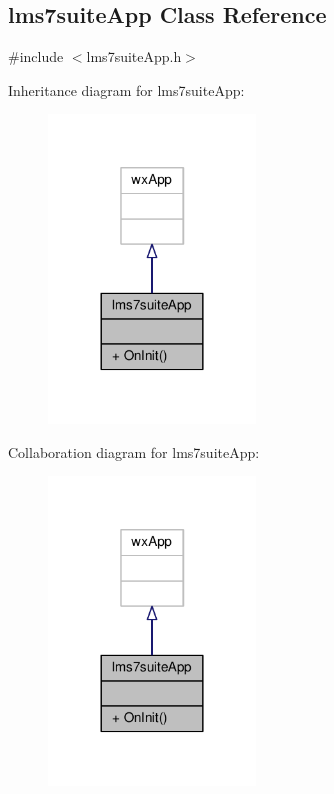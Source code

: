 \subsection{lms7suite\+App Class Reference}
\label{classlms7suiteApp}


{\ttfamily \#include $<$lms7suite\+App.\+h$>$}



Inheritance diagram for lms7suite\+App\+:
\nopagebreak
\begin{figure}[H]
\begin{center}
\leavevmode
\includegraphics[width=156pt]{d0/d6d/classlms7suiteApp__inherit__graph}
\end{center}
\end{figure}


Collaboration diagram for lms7suite\+App\+:
\nopagebreak
\begin{figure}[H]
\begin{center}
\leavevmode
\includegraphics[width=156pt]{de/d95/classlms7suiteApp__coll__graph}
\end{center}
\end{figure}
